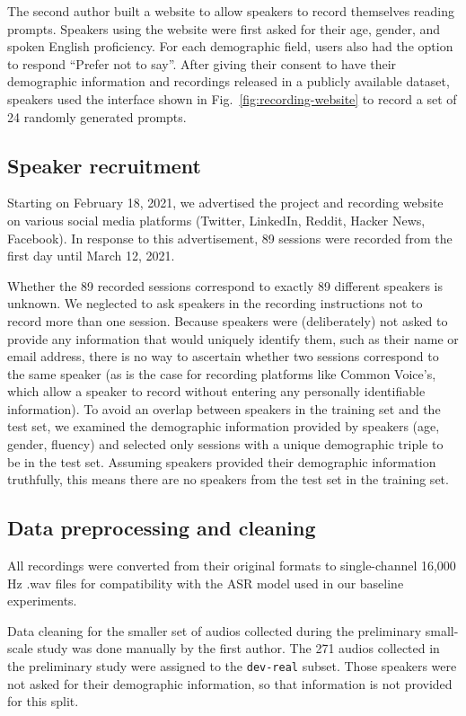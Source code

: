 \documentclass{article}
\begin{document}
The second author built a website to allow speakers to record themselves reading prompts. Speakers using the website were first asked for their age, gender, and spoken English proficiency. For each demographic field, users also had the option to respond ``Prefer not to say''. After giving their consent to have their demographic information and recordings released in a publicly available dataset, speakers used the interface shown in Fig.~\ref{fig:recording-website} to record a set of 24 randomly generated prompts.

\subsection{Speaker recruitment}\label{speaker-section}
Starting on February 18, 2021, we advertised the project and recording website on various social media platforms (Twitter, LinkedIn, Reddit, Hacker News, Facebook). In response to this advertisement, 89 sessions were recorded from the first day until March 12, 2021.

Whether the 89 recorded sessions correspond to exactly 89 different speakers is unknown. We neglected to ask speakers in the recording instructions not to record more than one session. Because speakers were (deliberately) not asked to provide any information that would uniquely identify them, such as their name or email address, there is no way to ascertain whether two sessions correspond to the same speaker (as is the case for recording platforms like Common Voice's, which allow a speaker to record without entering any personally identifiable information). 
To avoid an overlap between speakers in the training set and the test set, we examined the demographic information provided by speakers (age, gender, fluency) and selected only sessions with a unique demographic triple to be in the test set. Assuming speakers provided their demographic information truthfully, this means there are no speakers from the test set in the training set.

\subsection{Data preprocessing and cleaning}\label{data-prep}

All recordings were converted from their original formats to single-channel 16,000 Hz .wav files for compatibility with the ASR model used in our baseline experiments.

Data cleaning for the smaller set of audios collected during the preliminary small-scale study was done manually by the first author. The 271 audios collected in the preliminary study were assigned to the \texttt{dev-real} subset. Those speakers were not asked for their demographic information, so that information is not provided for this split. 
\end{document}
